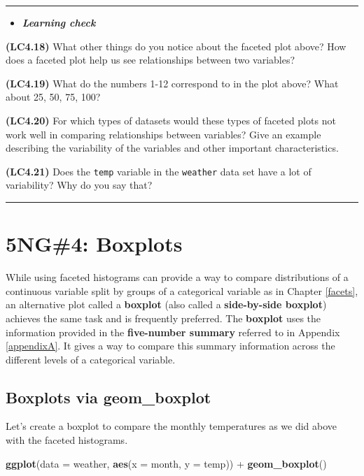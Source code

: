 \documentclass[]{tufte-book}
\newenvironment{Shaded}{\begin{snugshade}}{\end{snugshade}}
\newcommand{\KeywordTok}[1]{\textcolor[rgb]{0.13,0.29,0.53}{\textbf{{#1}}}}
\newcommand{\DataTypeTok}[1]{\textcolor[rgb]{0.13,0.29,0.53}{{#1}}}
\newcommand{\StringTok}[1]{\textcolor[rgb]{0.31,0.60,0.02}{{#1}}}
\newcommand{\NormalTok}[1]{{#1}}
\let\oldrule=\rule
\renewcommand{\rule}[1]{\oldrule{\linewidth}}
\newenvironment{rmdblock}[1]
  {\begin{shaded*}
  \begin{itemize}
  \renewcommand{\labelitemi}{
    \raisebox{-.7\height}[0pt][0pt]{
    }
  }
  \item
  }
  {
  \end{itemize}
  \end{shaded*}
  }
\newenvironment{learncheck}
  {\begin{rmdblock}{warning}}
  {\end{rmdblock}}
\begin{document}
\begin{center}\rule{0.5\linewidth}{\linethickness}\end{center}

\begin{learncheck}
\textbf{\emph{Learning check}}
\end{learncheck}

\textbf{(LC4.18)} What other things do you notice about the faceted plot
above? How does a faceted plot help us see relationships between two
variables?

\textbf{(LC4.19)} What do the numbers 1-12 correspond to in the plot
above? What about 25, 50, 75, 100?

\textbf{(LC4.20)} For which types of datasets would these types of
faceted plots not work well in comparing relationships between
variables? Give an example describing the variability of the variables
and other important characteristics.

\textbf{(LC4.21)} Does the \texttt{temp} variable in the
\texttt{weather} data set have a lot of variability? Why do you say
that?

\begin{center}\rule{0.5\linewidth}{\linethickness}\end{center}

\section{5NG\#4: Boxplots}\label{ng4-boxplots}

While using faceted histograms can provide a way to compare
distributions of a continuous variable split by groups of a categorical
variable as in Chapter \ref{facets}, an alternative plot called a
\textbf{boxplot} (also called a \textbf{side-by-side boxplot}) achieves
the same task and is frequently preferred. The \textbf{boxplot} uses the
information provided in the \textbf{five-number summary} referred to in
Appendix \ref{appendixA}. It gives a way to compare this summary
information across the different levels of a categorical variable.

\subsection{Boxplots via geom\_boxplot}\label{geomboxplot}

Let's create a boxplot to compare the monthly temperatures as we did
above with the faceted histograms.

\begin{Shaded}
\begin{Highlighting}[]
\KeywordTok{ggplot}\NormalTok{(}\DataTypeTok{data =} \NormalTok{weather, }\KeywordTok{aes}\NormalTok{(}\DataTypeTok{x =} \NormalTok{month, }\DataTypeTok{y =} \NormalTok{temp)) +}
\StringTok{  }\KeywordTok{geom_boxplot}\NormalTok{()}
\end{Highlighting}
\end{Shaded}
\end{document}
